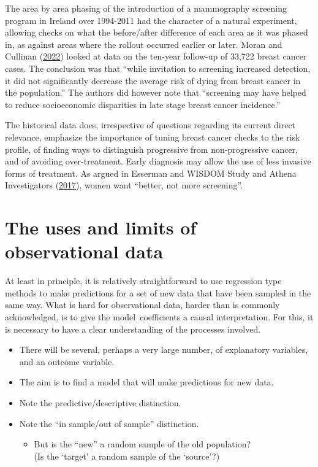 \documentclass[
  10ptls,
  b5paper]{book}
\providecommand{\tightlist}{%
  \setlength{\itemsep}{0pt}\setlength{\parskip}{0pt}}
\begin{document}
The area by area phasing of the introduction of a mammography screening
program in Ireland over 1994-2011 had the character of a natural
experiment, allowing checks on what the before/after difference of each
area as it was phased in, as against areas where the rollout occurred
earlier or later. Moran and Cullinan (\protect\hyperlink{ref-MORAN2022115073}{2022}) looked at data on the ten-year
follow-up of 33,722 breast cancer cases. The conclusion was that ``while
invitation to screening increased detection, it did not significantly
decrease the average risk of dying from breast cancer in the
population.'' The authors did however note that ``screening may have
helped to reduce socioeconomic disparities in late stage breast cancer
incidence.''

The historical data does, irrespective of questions regarding its
current direct relevance, emphasize the importance of tuning breast
cancer checks to the risk profile, of finding ways to distinguish
progressive from non-progressive cancer, and of avoiding over-treatment.
Early diagnosis may allow the use of less invasive forms of treatment.
As argued in Esserman and WISDOM Study and Athena Investigators (\protect\hyperlink{ref-essermanwisdom}{2017}), women want ``better, not more screening''.

\hypertarget{ch:obs}{%
\chapter{The uses and limits of observational data}\label{ch:obs}}

At least in principle, it is relatively straightforward to use regression type methods to make predictions for a set of new data that have been sampled in the same way. What is hard for observational data, harder than is commonly acknowledged, is to give the model~coefficients a causal interpretation. For this, it is necessary to have a clear understanding of the processes involved.

\begin{itemize}
\tightlist
\item
  There will be several, perhaps a very large number, of explanatory variables, and an outcome variable.
\item
  The aim is to find a model that will make predictions for new data.
\item
  Note the predictive/descriptive distinction.\\
\item
  Note the ``in sample/out of sample'' distinction.

  \begin{itemize}
  \tightlist
  \item
    But is the ``new'' a random sample of the old population?\\
    (Is the `target' a random sample of the `source'?)
  \end{itemize}
\end{itemize}
\end{document}
